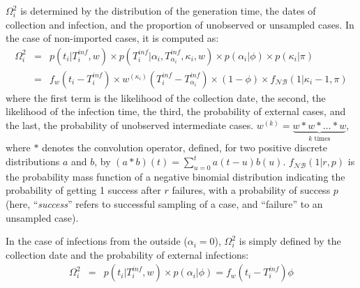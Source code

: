 \documentclass[10pt]{article}
\begin{document}
$\Omega_i^2$ is determined by the distribution of the generation time, the dates of collection and infection, and the proportion of unobserved or unsampled cases.
In the case of non-imported cases, it is computed as:
\begin{eqnarray}
 \Omega_i^2 & = & p(t_i | T_i^{inf}, w) \times p(T_i^{inf}| \alpha_i, T_{\alpha_i}^{inf}, \kappa_i, w)  
    \times p(\alpha_i | \phi) \times p(\kappa_i | \pi)\nonumber \\
& = &  f_w(t_i - T_i^{inf}) \times  w^{\left(\kappa_i\right)}(T_i^{inf} - T_{\alpha_i}^{inf})
  \times (1 -\phi) \times f_{\mathcal{NB}}(1 |\kappa_i-1, \pi)
\end{eqnarray}
where the first term is the likelihood of the collection date, the second, the likelihood of the infection time, the third, the probability of external cases, and the last, the probability of unobserved intermediate cases.
$w^{\left(k\right)} = \underbrace{w*w*\ldots*w}_{k \text{ times}} $, where $*$ denotes the convolution operator, defined, for two positive discrete distributions $a$ and $b$, by $\left(a*b\right)\left(t\right) = \sum_{u=0}^{t} a\left(t-u\right)b\left(u\right)$. 
$f_{\mathcal{NB}}(1 | r, p)$ is the probability mass function of a negative binomial distribution indicating the probability of getting 1 success after $r$ failures, with a probability of success $p$ (here, ``\textit{success}'' refers to successful sampling of a case, and ``failure'' to an unsampled case).


In the case of infections from the outside ($\alpha_i=0$), $\Omega_i^2$ is simply defined by the collection date and the probability of external infections:
\begin{eqnarray}
\Omega_i^2 & = & p(t_i | T_i^{inf}, w) \times p(\alpha_i | \phi) = f_w(t_i - T_i^{inf}) \phi
\end{eqnarray}
\\
\end{document}
